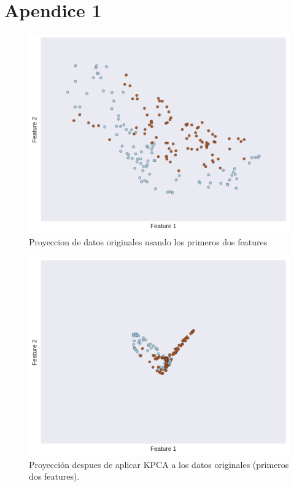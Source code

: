 \documentclass[fleqn,10pt]{SelfArx}
\begin{document}

\pagebreak
{}
\section*{Apendice 1}

\begin{figure}[hbtp]
\caption{Proyeccion de datos originales usando los primeros dos features}
\centering
\includegraphics[scale=0.4]{fig/sinKPCA.png}
\end{figure}
\begin{figure}[hbtp]
\caption{Proyección despues de aplicar KPCA a los datos originales (primeros dos features). }
\centering
\includegraphics[scale=0.4]{fig/conKPCA.png}
\end{figure}
\end{document}
